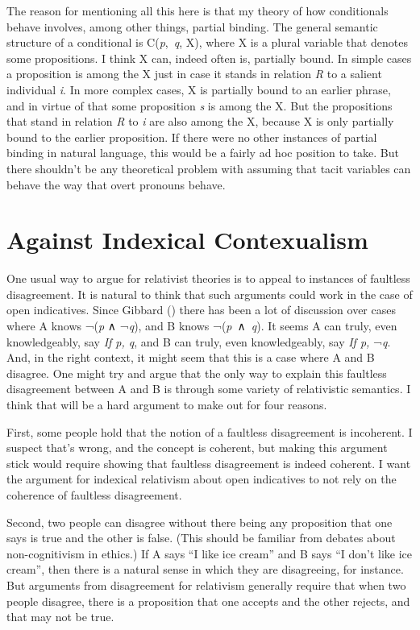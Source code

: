 \documentclass[
  11pt,
  letterpaper,
  DIV=11,
  numbers=noendperiod,
  twoside]{scrartcl}
\begin{document}
The reason for mentioning all this here is that my theory of how
conditionals behave involves, among other things, partial binding. The
general semantic structure of a conditional is C(\emph{p},~\emph{q}, X),
where X is a plural variable that denotes some propositions. I think X
can, indeed often is, partially bound. In simple cases a proposition is
among the X just in case it stands in relation \emph{R} to a salient
individual \emph{i}. In more complex cases, X is partially bound to an
earlier phrase, and in virtue of that some proposition \emph{s} is among
the X. But the propositions that stand in relation \emph{R} to \emph{i}
are also among the X, because X is only partially bound to the earlier
proposition. If there were no other instances of partial binding in
natural language, this would be a fairly ad hoc position to take. But
there shouldn't be any theoretical problem with assuming that tacit
variables can behave the way that overt pronouns behave.

\section{Against Indexical
Contexualism}\label{against-indexical-contexualism}

One usual way to argue for relativist theories is to appeal to instances
of faultless disagreement. It is natural to think that such arguments
could work in the case of open indicatives. Since Gibbard
() there has been a lot of discussion
over cases where A knows ¬(\emph{p} ∧ ¬\emph{q}), and B knows
¬(\emph{p}~∧~\emph{q}). It seems A can truly, even knowledgeably, say
\emph{If p, q}, and B can truly, even knowledgeably, say \emph{If p,}
¬\emph{q}. And, in the right context, it might seem that this is a case
where A and B disagree. One might try and argue that the only way to
explain this faultless disagreement between A and B is through some
variety of relativistic semantics. I think that will be a hard argument
to make out for four reasons.

First, some people hold that the notion of a faultless disagreement is
incoherent. I suspect that's wrong, and the concept is coherent, but
making this argument stick would require showing that faultless
disagreement is indeed coherent. I want the argument for indexical
relativism about open indicatives to not rely on the coherence of
faultless disagreement.

Second, two people can disagree without there being any proposition that
one says is true and the other is false. (This should be familiar from
debates about non-cognitivism in ethics.) If A says ``I like ice cream''
and B says ``I don't like ice cream'', then there is a natural sense in
which they are disagreeing, for instance. But arguments from
disagreement for relativism generally require that when two people
disagree, there is a proposition that one accepts and the other rejects,
and that may not be true.
\end{document}
